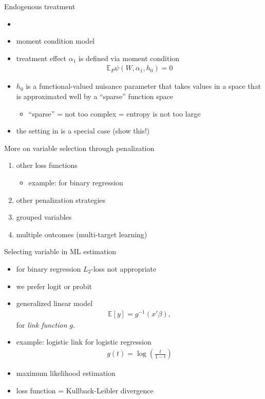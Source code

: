 \documentclass[xcolor=dvipsnames, handout]{beamer}
\newcommand{\E}{\mathbb{E}}
\begin{document}
\begin{frame}{Endogenous treatment}
\begin{itemize}
\item \textcite{belloni2017program}
\item
moment condition model
\item 
treatment effect $\alpha_1$ is defined via moment condition
\begin{align*}
\E_{P} \psi \left(W, \alpha_1, h_0 \right) = 0
\end{align*}
\item 
$h_0$ is a functional-valued nuisance parameter that takes values in a space that is approximated well by a ``sparse'' function space
\begin{itemize}
  \item ``sparse'' = not too complex = entropy is not too large
\end{itemize}
\item
the setting in \textcite{belloni2014inference} is a special case (show this!)
\end{itemize}
\end{frame}


\begin{frame}{More on variable selection through penalization}
\begin{enumerate}[<+->]
  \item other loss functions
  \begin{itemize}
    \item example: for binary regression
  \end{itemize}
  \item other penalization strategies
  \item grouped variables 
  \item multiple outcomes (multi-target learning)
\end{enumerate}
\end{frame}


\begin{frame}{Selecting variable in ML estimation}

\begin{itemize}[<+->]
  \item for binary regression $L_2$-loss not appropriate
  \item we prefer logit or probit
  \item generalized linear model 
  \begin{align*}
    \E [y] = g^{-1} (x'\beta), 
  \end{align*} 
  for \emph{link function} $g$.
  \item example: logistic link for logistic regression 
  \begin{align*}
    g(t) = \log \left(\frac{t}{1 - t}\right)
  \end{align*}
  \item maximum likelihood estimation 
  \item loss function = Kullback-Leibler divergence
\end{itemize}

\end{frame}
\end{document}
